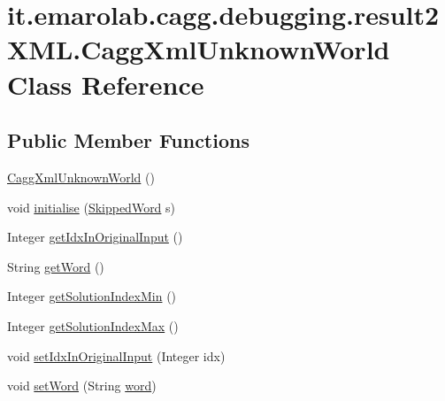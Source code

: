 \hypertarget{classit_1_1emarolab_1_1cagg_1_1debugging_1_1result2XML_1_1CaggXmlUnknownWorld}{\section{it.\-emarolab.\-cagg.\-debugging.\-result2\-X\-M\-L.\-Cagg\-Xml\-Unknown\-World Class Reference}
\label{classit_1_1emarolab_1_1cagg_1_1debugging_1_1result2XML_1_1CaggXmlUnknownWorld}
}
\subsection*{Public Member Functions}
\begin{DoxyCompactItemize}
\item 
\hyperlink{classit_1_1emarolab_1_1cagg_1_1debugging_1_1result2XML_1_1CaggXmlUnknownWorld_a6687f481bf7812065200b8f01384c394}{Cagg\-Xml\-Unknown\-World} ()
\item 
void \hyperlink{classit_1_1emarolab_1_1cagg_1_1debugging_1_1result2XML_1_1CaggXmlUnknownWorld_af835e39df9d64f66c2dfa96afe43e948}{initialise} (\hyperlink{classit_1_1emarolab_1_1cagg_1_1core_1_1evaluation_1_1inputFormatting_1_1ThreadedInputFormatter_1_1SkippedWord}{Skipped\-Word} s)
\item 
Integer \hyperlink{classit_1_1emarolab_1_1cagg_1_1debugging_1_1result2XML_1_1CaggXmlUnknownWorld_a2b4d621a09444d4be147900edf62d15a}{get\-Idx\-In\-Original\-Input} ()
\item 
String \hyperlink{classit_1_1emarolab_1_1cagg_1_1debugging_1_1result2XML_1_1CaggXmlUnknownWorld_a7fb691ab24e19b0f710737e939bc6dc0}{get\-Word} ()
\item 
Integer \hyperlink{classit_1_1emarolab_1_1cagg_1_1debugging_1_1result2XML_1_1CaggXmlUnknownWorld_a59fc1afeadce960a2563a89d047be196}{get\-Solution\-Index\-Min} ()
\item 
Integer \hyperlink{classit_1_1emarolab_1_1cagg_1_1debugging_1_1result2XML_1_1CaggXmlUnknownWorld_aaac83913e52a7fd039cb81a34bd55c6f}{get\-Solution\-Index\-Max} ()
\item 
void \hyperlink{classit_1_1emarolab_1_1cagg_1_1debugging_1_1result2XML_1_1CaggXmlUnknownWorld_a99ee8c407bfaba3105d4d9246857bfbe}{set\-Idx\-In\-Original\-Input} (Integer idx)
\item 
void \hyperlink{classit_1_1emarolab_1_1cagg_1_1debugging_1_1result2XML_1_1CaggXmlUnknownWorld_a9400d9312cbd42cfc11c2980b52dcc04}{set\-Word} (String \hyperlink{classit_1_1emarolab_1_1cagg_1_1debugging_1_1result2XML_1_1CaggXmlUnknownWorld_a26bce6329474f319129e5c3624741075}{word})

\end{DoxyCompactItemize}
